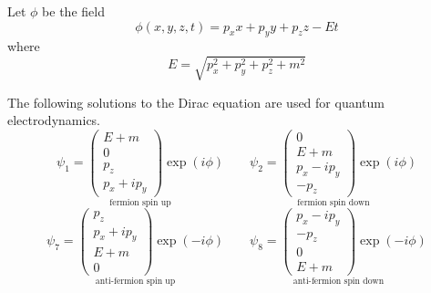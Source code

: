 \documentclass[12pt]{article}
\begin{document}
\noindent
Let $\phi$ be the field
\begin{equation*}
\phi(x,y,z,t)=p_xx+p_yy+p_zz-Et
\end{equation*}
where
\begin{equation*}
E=\sqrt{p_x^2+p_y^2+p_z^2+m^2}
\end{equation*}

\noindent
The following solutions to the Dirac equation are used for quantum electrodynamics.
\begin{equation*}
\underset{\text{fermion spin up}}
{
\psi_1=\begin{pmatrix}E+m\\0\\p_z\\p_x+ip_y\end{pmatrix}
\exp\left(i\phi\right)
}
\qquad
\underset{\text{fermion spin down}}
{
\psi_2=\begin{pmatrix}0\\E+m\\p_x-ip_y\\-p_z\end{pmatrix}
\exp\left(i\phi\right)
}
\end{equation*}
\begin{equation*}
\underset{\text{anti-fermion spin up}}
{
\psi_7=\begin{pmatrix}p_z\\p_x+ip_y\\E+m\\0\end{pmatrix}
\exp\left(-i\phi\right)
}
\qquad
\underset{\text{anti-fermion spin down}}
{
\psi_8=\begin{pmatrix}p_x-ip_y\\-p_z\\0\\E+m\end{pmatrix}
\exp\left(-i\phi\right)
}
\end{equation*}
\end{document}
